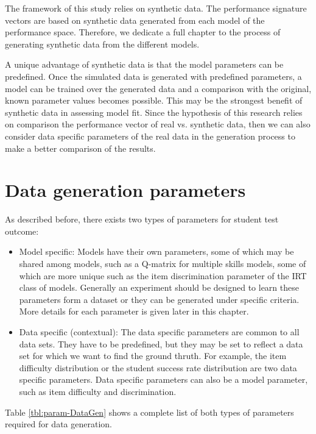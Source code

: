 \label{sec:Syn}


The framework of this study relies on synthetic data. The performance signature vectors are based on synthetic data generated from each model of the performance space.  Therefore, we dedicate a full chapter to the process of generating synthetic data from the different models.

A unique advantage of synthetic data is that the model parameters can be predefined. Once the simulated data is generated with predefined parameters, a model can be trained over the generated data and a comparison with the original, known parameter values becomes possible. This may be the strongest benefit of synthetic data in assessing model fit. Since the hypothesis of this research relies on comparison the performance vector of real vs. synthetic data, then we can also consider data specific parameters of the real data in the generation process to make a better comparison of the results.

\section{Data generation parameters}
As described before, there exists two types of parameters for student test outcome:
\begin{itemize}
\item Model specific: Models have their own parameters, some of which may be shared among models, such as a Q-matrix for multiple skills models, some of which are more unique such as the item discrimination parameter of the IRT class of models. Generally an experiment should be designed to learn these parameters form a dataset or they can be generated under specific criteria. More details for each parameter is given later in this chapter.
\item Data specific (contextual): The data specific parameters are common to all data sets.  They have to be predefined, but they may be set to reflect a data set for which we want to find the ground thruth.  For example, the item difficulty distribution or the student success rate distribution are two data specific parameters.  Data specific parameters can also be a model parameter, such as item difficulty and discrimination.
\end{itemize}

Table \ref{tbl:param-DataGen} shows a complete list of both types of parameters required for data generation.

